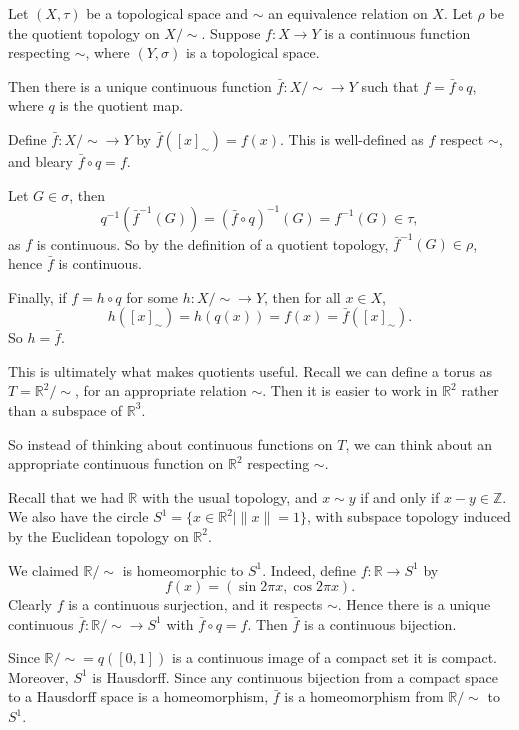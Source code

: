 \documentclass[12pt]{article}
\begin{document}
\begin{proposition}
	Let $(X, \tau)$ be a topological space and $\sim$ an equivalence relation on $X$. Let $\rho$ be the quotient topology on $X/\sim$. Suppose $f : X \to Y$ is a continuous function respecting $\sim$, where $(Y, \sigma)$ is a topological space.

	Then there is a unique continuous function $\bar f : X/\sim \to Y$ such that $f = \bar f \circ q$, where $q$ is the quotient map.
\end{proposition}

\begin{proofbox}
	Define $\bar f : X/\sim \to Y$ by $\bar f([x]_{\sim}) = f(x)$. This is well-defined as $f$ respect $\sim$, and bleary $\bar f \circ q = f$.

	Let $G \in \sigma$, then
	\[
		q^{-1}(\bar f^{-1}(G)) = (\bar f \circ q)^{-1}(G) = f^{-1}(G) \in \tau
	,\]
	as $f$ is continuous. So by the definition of a quotient topology, $\bar f^{-1}(G) \in \rho$, hence $\bar f$ is continuous.

	Finally, if $f = h \circ q$ for some $h : X / \sim \to Y$, then for all $x \in X$,
	\[
		h([x]_{\sim}) = h(q(x)) = f(x) = \bar f([x]_{\sim})
	.\]
	So $h = \bar f$.
\end{proofbox}

\begin{remark}
	This is ultimately what makes quotients useful. Recall we can define a torus as $T = \mathbb{R}^2/\sim$, for an appropriate relation $\sim$. Then it is easier to work in $\mathbb{R}^2$ rather than a subspace of $\mathbb{R}^3$.

	So instead of thinking about continuous functions on $T$, we can think about an appropriate continuous function on $\mathbb{R}^2$ respecting $\sim$.
\end{remark}

\begin{exbox}
	Recall that we had $\mathbb{R}$ with the usual topology, and $x \sim y$ if and only if $x - y \in \mathbb{Z}$. We also have the circle $S^{1} = \{x \in \mathbb{R}^2 \mid \|x\| = 1\}$, with subspace topology induced by the Euclidean topology on $\mathbb{R}^2$.

	We claimed $\mathbb{R}/\sim$ is homeomorphic to $S^{1}$. Indeed, define $f : \mathbb{R} \to S^{1}$ by
	\[
		f(x) = (\sin 2 \pi x, \cos 2 \pi x)
	.\]
	Clearly $f$ is a continuous surjection, and it respects $\sim$. Hence there is a unique continuous $\bar f : \mathbb{R} / \sim \to S^{1}$ with $\bar f \circ q = f$. Then $\bar f$ is a continuous bijection.

	Since $\mathbb{R}/ \sim = q([0, 1])$ is a continuous image of a compact set it is compact. Moreover, $S^{1}$ is Hausdorff. Since any continuous bijection from a compact space to a Hausdorff space is a homeomorphism, $\bar f$ is a homeomorphism from $\mathbb{R}/\sim$ to $S^{1}$.
\end{exbox}
\end{document}
